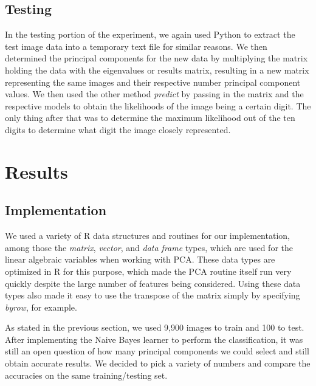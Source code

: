 \documentclass[twocolumn]{article}
\begin{document}
\subsection{Testing} %
\label{subsec:testing}
In the testing portion of the experiment, we again used Python to extract the test image data into a temporary text file for similar reasons. We then determined the principal components for the new data by multiplying the matrix holding the data with the eigenvalues or results matrix, resulting in a new matrix representing the same images and their respective number principal component values. We then used the other method \emph{predict} by passing in the matrix and the respective models to obtain the likelihoods of the image being a certain digit. The only thing after that was to determine the maximum likelihood out of the ten digits to determine what digit the image closely represented.
\section{Results} %
\label{sec:results}

\subsection{Implementation}
\label{subsec:narrative}

We used a variety of R data structures and routines for our implementation, among those the \emph{matrix}, \emph{vector}, and \emph{data frame} types, which are used for the linear algebraic variables when working with PCA. These data types are optimized in R for this purpose, which made the PCA routine itself run very quickly despite the large number of features being considered. Using these data types also made it easy to use the transpose of the matrix simply by specifying \emph{byrow}, for example.

As stated in the previous section, we used 9,900 images to train and 100 to test. After implementing the Naive Bayes learner to perform the classification, it was still an open question of how many principal components we could select and still obtain accurate results. We decided to pick a variety of numbers and compare the accuracies on the same training/testing set. 
\end{document}
